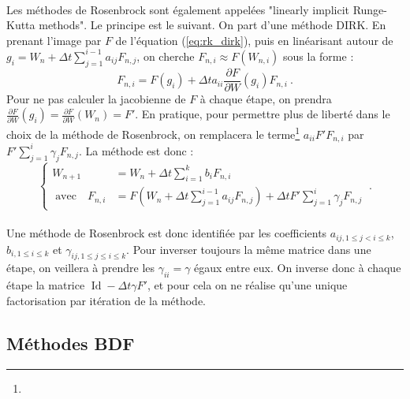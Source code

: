       \paragraph{}
      Les méthodes de Rosenbrock sont également appelées "linearly implicit Runge-Kutta methods".
      Le principe est le suivant.
      On part d'une méthode DIRK.
      En prenant l'image par $F$ de l'équation (\ref{eq:rk_dirk}), puis en linéarisant autour de $g_i = W_n + \Delta t\sum_{j = 1}^{i-1}a_{ij}F_{n,j}$, on cherche $F_{n,i} \approx F\left(W_{n,i}\right)$ sous la forme :
      \[F_{n,i} = F\left(g_i\right) + \Delta ta_{ii}\frac{\partial F}{\partial W}\left(g_i\right)F_{n,i}\ .\]
      Pour ne pas calculer la jacobienne de $F$ à chaque étape, on prendra $\frac{\partial F}{\partial W}\left(g_i\right) = \frac{\partial F}{\partial W}\left(W_n\right) = F'$.
      En pratique, pour permettre plus de liberté dans le choix de la méthode de Rosenbrock, on remplacera le terme\footnote{} $a_{ii}F'F_{n,i}$ par $F'\sum_{j=1}^i\gamma_jF_{n,j}$.
      La méthode est donc :
      \begin{equation}\label{eq:rk_rosenbrock}
        \left\{\begin{aligned}
          W_{n+1} &= W_n + \Delta t\sum_{i = 1}^kb_iF_{n,i} \\
          \;\textrm{avec}\quad F_{n,i} &= F\left(W_n + \Delta t\sum_{j = 1}^{i-1}a_{ij}F_{n,j}\right) + \Delta tF'\sum_{j=1}^i\gamma_jF_{n,j}
        \end{aligned}\right.\ .
      \end{equation}

      \paragraph{}
      Une méthode de Rosenbrock est donc identifiée par les coefficients $a_{ij, 1\leq j<i\leq k}$, $b_{i, 1\leq i\leq k}$ et $\gamma_{ij, 1\leq j\leq i\leq k}$.
      Pour inverser toujours la même matrice dans une étape, on veillera à prendre les $\gamma_{ii} = \gamma$ égaux entre eux.
      On inverse donc à chaque étape la matrice $\operatorname{Id} - \Delta t\gamma F'$, et pour cela on ne réalise qu'une unique factorisation par itération de la méthode.


  \subsection{Méthodes BDF}

